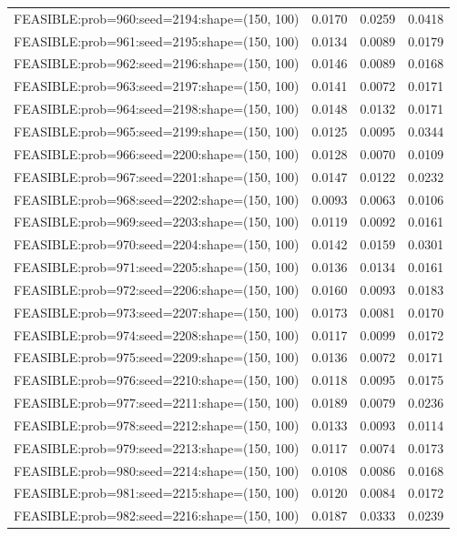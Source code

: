 \begin{longtable}{lccc}
FEASIBLE:prob=960:seed=2194:shape=(150, 100) &   0.0170 & 0.0259 & 0.0418 \\
FEASIBLE:prob=961:seed=2195:shape=(150, 100) &   0.0134 & 0.0089 & 0.0179 \\
FEASIBLE:prob=962:seed=2196:shape=(150, 100) &   0.0146 & 0.0089 & 0.0168 \\
FEASIBLE:prob=963:seed=2197:shape=(150, 100) &   0.0141 & 0.0072 & 0.0171 \\
FEASIBLE:prob=964:seed=2198:shape=(150, 100) &   0.0148 & 0.0132 & 0.0171 \\
FEASIBLE:prob=965:seed=2199:shape=(150, 100) &   0.0125 & 0.0095 & 0.0344 \\
FEASIBLE:prob=966:seed=2200:shape=(150, 100) &   0.0128 & 0.0070 & 0.0109 \\
FEASIBLE:prob=967:seed=2201:shape=(150, 100) &   0.0147 & 0.0122 & 0.0232 \\
FEASIBLE:prob=968:seed=2202:shape=(150, 100) &   0.0093 & 0.0063 & 0.0106 \\
FEASIBLE:prob=969:seed=2203:shape=(150, 100) &   0.0119 & 0.0092 & 0.0161 \\
FEASIBLE:prob=970:seed=2204:shape=(150, 100) &   0.0142 & 0.0159 & 0.0301 \\
FEASIBLE:prob=971:seed=2205:shape=(150, 100) &   0.0136 & 0.0134 & 0.0161 \\
FEASIBLE:prob=972:seed=2206:shape=(150, 100) &   0.0160 & 0.0093 & 0.0183 \\
FEASIBLE:prob=973:seed=2207:shape=(150, 100) &   0.0173 & 0.0081 & 0.0170 \\
FEASIBLE:prob=974:seed=2208:shape=(150, 100) &   0.0117 & 0.0099 & 0.0172 \\
FEASIBLE:prob=975:seed=2209:shape=(150, 100) &   0.0136 & 0.0072 & 0.0171 \\
FEASIBLE:prob=976:seed=2210:shape=(150, 100) &   0.0118 & 0.0095 & 0.0175 \\
FEASIBLE:prob=977:seed=2211:shape=(150, 100) &   0.0189 & 0.0079 & 0.0236 \\
FEASIBLE:prob=978:seed=2212:shape=(150, 100) &   0.0133 & 0.0093 & 0.0114 \\
FEASIBLE:prob=979:seed=2213:shape=(150, 100) &   0.0117 & 0.0074 & 0.0173 \\
FEASIBLE:prob=980:seed=2214:shape=(150, 100) &   0.0108 & 0.0086 & 0.0168 \\
FEASIBLE:prob=981:seed=2215:shape=(150, 100) &   0.0120 & 0.0084 & 0.0172 \\
FEASIBLE:prob=982:seed=2216:shape=(150, 100) &   0.0187 & 0.0333 & 0.0239 \\

\end{longtable}
